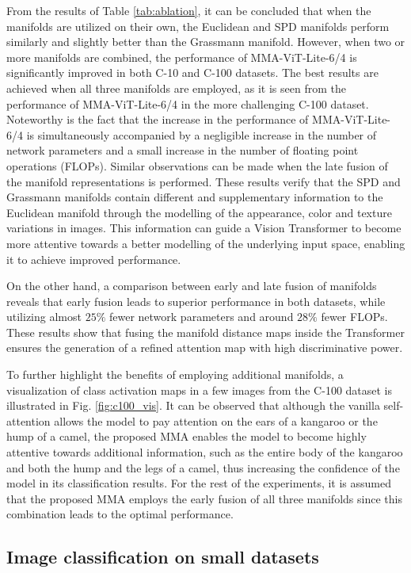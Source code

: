 \documentclass[10pt,twocolumn,letterpaper]{article}
\begin{document}
From the results of Table \ref{tab:ablation}, it can be concluded that when the manifolds are utilized on their own, the Euclidean and SPD manifolds perform similarly and slightly better than the Grassmann manifold. However, when two or more manifolds are combined, the performance of MMA-ViT-Lite-6/4 is significantly improved in both C-10 and C-100 datasets. The best results are achieved when all three manifolds are employed, as it is seen from the performance of MMA-ViT-Lite-6/4 in the more challenging C-100 dataset. Noteworthy is the fact that the increase in the performance of MMA-ViT-Lite-6/4 is simultaneously accompanied by a negligible increase in the number of network parameters and a small increase in the number of floating point operations (FLOPs). Similar observations can be made when the late fusion of the manifold representations is performed. These results verify that the SPD and Grassmann manifolds contain different and supplementary information to the Euclidean manifold through the modelling of the appearance, color and texture variations in images. This information can guide a Vision Transformer to become more attentive towards a better modelling of the underlying input space, enabling it to achieve improved performance.

On the other hand, a comparison between early and late fusion of manifolds reveals that early fusion leads to superior performance in both datasets, while utilizing almost $25\%$ fewer network parameters and around $28\%$ fewer FLOPs. These results show that fusing the manifold distance maps inside the Transformer ensures the generation of a refined attention map with high discriminative power.

To further highlight the benefits of employing additional manifolds, a visualization of class activation maps in a few images from the C-100 dataset is illustrated in Fig. \ref{fig:c100_vis}. It can be observed that although the vanilla self-attention allows the model to pay attention on the ears of a kangaroo or the hump of a camel, the proposed MMA enables the model to become highly attentive towards additional information, such as the entire body of the kangaroo and both the hump and the legs of a camel, thus increasing the confidence of the model in its classification results. For the rest of the experiments, it is assumed that the proposed MMA employs the early fusion of all three manifolds since this combination leads to the optimal performance.

\subsection{Image classification on small datasets}
\end{document}
